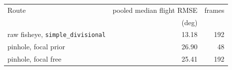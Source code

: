 \begin{tabular}{lrr}
\toprule
Route & pooled median flight RMSE & frames \\
 & (deg) & \\
\midrule
raw fisheye, \texttt{simple\_divisional} & 13.18 & 192 \\
pinhole, focal prior & 26.90 & 48 \\
pinhole, focal free & 25.41 & 192 \\
\bottomrule
\end{tabular}
